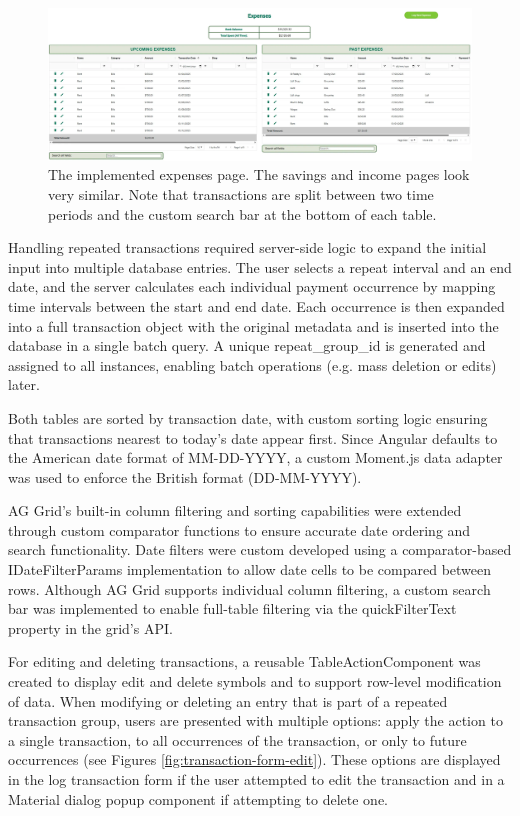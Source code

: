 \documentclass{l4proj}
\begin{document}
\begin{figure}[htb]
    \centering
    \includegraphics[width=\linewidth]{images/UI-Screenshots/transaction-page.png}
    \caption{The implemented expenses page. The savings and income pages look very similar. Note that transactions are split between two time periods and the custom search bar at the bottom of each table.}
    \label{fig:transaction-page}
\end{figure}

Handling repeated transactions required server-side logic to expand the initial input into multiple database entries. The user selects a repeat interval and an end date, and the server calculates each individual payment occurrence by mapping time intervals between the start and end date. Each occurrence is then expanded into a full transaction object with the original metadata and is inserted into the database in a single batch query. A unique repeat\_group\_id is generated and assigned to all instances, enabling batch operations (e.g. mass deletion or edits) later.

Both tables are sorted by transaction date, with custom sorting logic ensuring that transactions nearest to today’s date appear first. Since Angular defaults to the American date format of MM-DD-YYYY, a custom Moment.js data adapter was used to enforce the British format (DD-MM-YYYY).

AG Grid’s built-in column filtering and sorting capabilities were extended through custom comparator functions to ensure accurate date ordering and search functionality. Date filters were custom developed using a comparator-based IDateFilterParams implementation to allow date cells to be compared between rows. Although AG Grid supports individual column filtering, a custom search bar was implemented to enable full-table filtering via the quickFilterText property in the grid’s API.

For editing and deleting transactions, a reusable TableActionComponent was created to display edit and delete symbols and to support row-level modification of data. When modifying or deleting an entry that is part of a repeated transaction group, users are presented with multiple options: apply the action to a single transaction, to all occurrences of the transaction, or only to future occurrences (see Figures \ref{fig:transaction-form-edit}). These options are displayed in the log transaction form if the user attempted to edit the transaction and in a Material dialog popup component if attempting to delete one.
\end{document}
